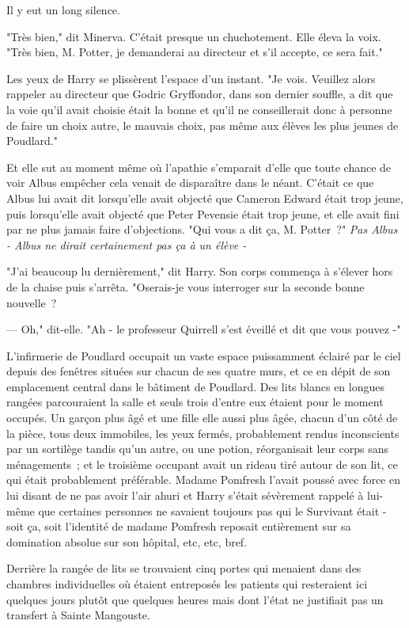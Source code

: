 Il y eut un long silence.

"Très bien," dit Minerva. C'était presque un chuchotement. Elle éleva la voix. "Très bien, M. Potter, je demanderai au directeur et s'il accepte, ce sera fait."

Les yeux de Harry se plissèrent l'espace d'un instant. "Je vois. Veuillez alors rappeler au directeur que Godric Gryffondor, dans son dernier souffle, a dit que la voie qu'il avait choisie était la bonne et qu'il ne conseillerait donc à personne de faire un choix autre, le mauvais choix, pas même aux élèves les plus jeunes de Poudlard."

Et elle sut au moment même où l'apathie s'emparait d'elle que toute chance de voir Albus empêcher cela venait de disparaître dans le néant. C'était ce que Albus lui avait dit lorsqu'elle avait objecté que Cameron Edward était trop jeune, puis lorsqu'elle avait objecté que Peter Pevensie était trop jeune, et elle avait fini par ne plus jamais faire d'objections. "Qui vous a dit ça, M. Potter~?" \emph{Pas Albus - Albus ne dirait certainement pas ça à un élève -}

"J'ai beaucoup lu dernièrement," dit Harry. Son corps commença à s'élever hors de la chaise puis s'arrêta. "Oserais-je vous interroger sur la seconde bonne nouvelle~?

--- Oh," dit-elle. "Ah - le professeur Quirrell s'est éveillé et dit que vous pouvez -"

\later

L'infirmerie de Poudlard occupait un vaste espace puissamment éclairé par le ciel depuis des fenêtres situées sur chacun de ses quatre murs, et ce en dépit de son emplacement central dans le bâtiment de Poudlard. Des lits blancs en longues rangées parcouraient la salle et seuls trois d'entre eux étaient pour le moment occupés. Un garçon plus âgé et une fille elle aussi plus âgée, chacun d'un côté de la pièce, tous deux immobiles, les yeux fermés, probablement rendus inconscients par un sortilège tandis qu'un autre, ou une potion, réorganisait leur corps sans ménagements~; et le troisième occupant avait un rideau tiré autour de son lit, ce qui était probablement préférable. Madame Pomfresh l'avait poussé avec force en lui disant de ne pas avoir l'air ahuri et Harry s'était sévèrement rappelé à lui-même que certaines personnes ne savaient toujours pas qui le Survivant était - soit ça, soit l'identité de madame Pomfresh reposait entièrement sur sa domination absolue sur son hôpital, etc, etc, bref.

Derrière la rangée de lits se trouvaient cinq portes qui menaient dans des chambres individuelles où étaient entreposés les patients qui resteraient ici quelques jours plutôt que quelques heures mais dont l'état ne justifiait pas un transfert à Sainte Mangouste.

